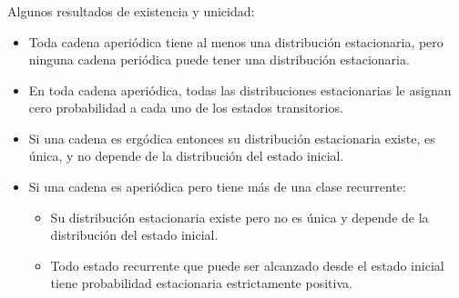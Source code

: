 \documentclass[ 10pt, xcolor = dvipsnames]{beamer}
\begin{document}
\begin{frame}[allowframebreaks]
\frametitle{\insertsubsection}

Algunos resultados de existencia y unicidad: 
\begin{itemize}
\item Toda cadena aperi\'odica tiene al menos una distribuci\'on estacionaria, \linebreak pero ninguna cadena peri\'odica puede tener una distribuci\'on estacionaria. 
\item En toda cadena aperi\'odica, todas las distribuciones estacionarias le asignan cero probabilidad a cada uno de los estados transitorios. 
\item Si una cadena es erg\'odica entonces su distribuci\'on estacionaria existe, \linebreak es \'unica, y no depende de la distribuci\'on del estado inicial. 
\item Si una cadena es aperi\'odica pero tiene m\'as de una clase recurrente: 
\begin{itemize}
\item Su distribuci\'on estacionaria existe pero no es \'unica y depende de la distribuci\'on del estado inicial. 
\item Todo estado recurrente que puede ser alcanzado desde el estado inicial tiene probabilidad estacionaria estrictamente positiva. 
\end{itemize}

\end{itemize}

\end{frame}
\end{document}
